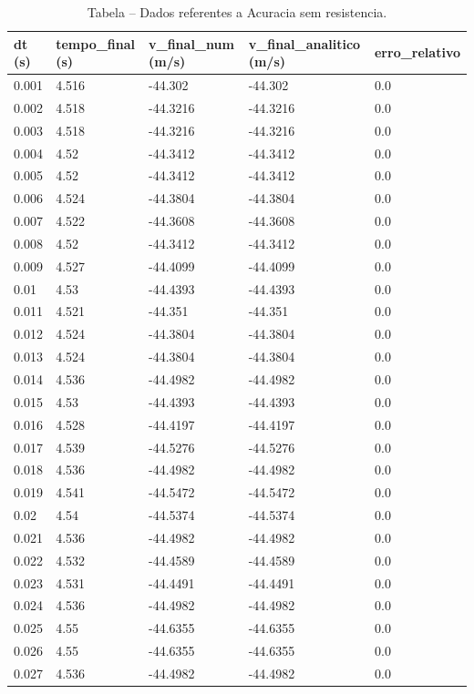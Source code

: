 \begin{table}[H]
\centering
\caption{Tabela – Dados referentes a Acuracia sem resistencia.}
\label{tab:acuracia_sem_resistencia}
\begin{tabular}{lllll}
\toprule
dt (s) & tempo\_final (s) & v\_final\_num (m/s) & v\_final\_analitico (m/s) & erro\_relativo \\
\midrule
0.001 & 4.516 & -44.302 & -44.302 & 0.0 \\
0.002 & 4.518 & -44.3216 & -44.3216 & 0.0 \\
0.003 & 4.518 & -44.3216 & -44.3216 & 0.0 \\
0.004 & 4.52 & -44.3412 & -44.3412 & 0.0 \\
0.005 & 4.52 & -44.3412 & -44.3412 & 0.0 \\
0.006 & 4.524 & -44.3804 & -44.3804 & 0.0 \\
0.007 & 4.522 & -44.3608 & -44.3608 & 0.0 \\
0.008 & 4.52 & -44.3412 & -44.3412 & 0.0 \\
0.009 & 4.527 & -44.4099 & -44.4099 & 0.0 \\
0.01 & 4.53 & -44.4393 & -44.4393 & 0.0 \\
0.011 & 4.521 & -44.351 & -44.351 & 0.0 \\
0.012 & 4.524 & -44.3804 & -44.3804 & 0.0 \\
0.013 & 4.524 & -44.3804 & -44.3804 & 0.0 \\
0.014 & 4.536 & -44.4982 & -44.4982 & 0.0 \\
0.015 & 4.53 & -44.4393 & -44.4393 & 0.0 \\
0.016 & 4.528 & -44.4197 & -44.4197 & 0.0 \\
0.017 & 4.539 & -44.5276 & -44.5276 & 0.0 \\
0.018 & 4.536 & -44.4982 & -44.4982 & 0.0 \\
0.019 & 4.541 & -44.5472 & -44.5472 & 0.0 \\
0.02 & 4.54 & -44.5374 & -44.5374 & 0.0 \\
0.021 & 4.536 & -44.4982 & -44.4982 & 0.0 \\
0.022 & 4.532 & -44.4589 & -44.4589 & 0.0 \\
0.023 & 4.531 & -44.4491 & -44.4491 & 0.0 \\
0.024 & 4.536 & -44.4982 & -44.4982 & 0.0 \\
0.025 & 4.55 & -44.6355 & -44.6355 & 0.0 \\
0.026 & 4.55 & -44.6355 & -44.6355 & 0.0 \\
0.027 & 4.536 & -44.4982 & -44.4982 & 0.0 \\

\end{tabular}
\end{table}
